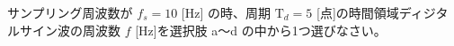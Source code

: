 サンプリング周波数が $f_s = 10$ [Hz] の時、周期 $\textrm{T}_d = 5$ [点]の時間領域ディジタルサイン波の周波数 $f$ [Hz]を選択肢 a〜d の中から1つ選びなさい。
